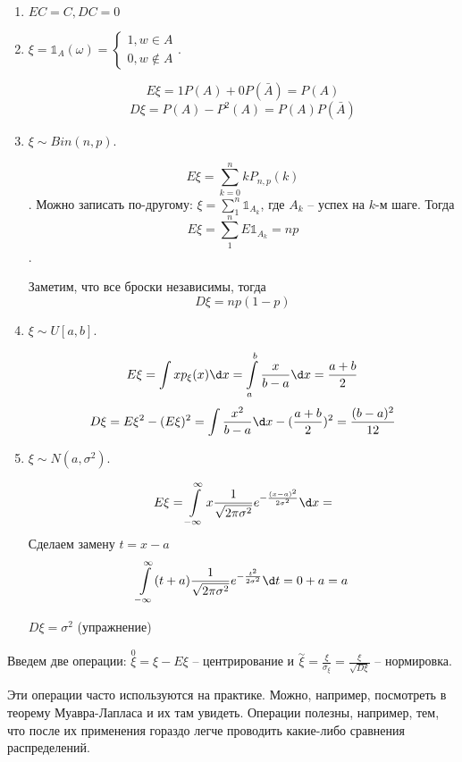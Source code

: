 \begin{exmp}

\begin{enumerate}

\item $EC = C, DC = 0$
\item $\xi = \mathbb{1}_A(\omega) = \begin{cases} 1, w \in A \\ 0, w \notin A \end{cases}$.

$$E\xi = 1 P(A) + 0 P(\bar A) = P(A)$$
$$D\xi = P(A) - P^2(A) = P(A) P(\bar A)$$
\item $\xi \sim Bin(n, p)$. 

$$E\xi = \sum\limits_{k=0}^n k P_{n, p}(k)$$. 
Можно записать по-другому: $\xi = \sum\limits_1^n \mathbb{1}_{A_k}$, где $A_k$ -- успех на $k$-м шаге. Тогда $$E\xi = \sum\limits_1^n E \mathbb{1}_{A_k} = np$$.

Заметим, что все броски независимы, тогда 
$$D\xi = n p (1-p)$$

\item $\xi \sim U[a, b]$. 

$$E \xi = \int x p_\xi(x) \d x = \int\limits_a^b \frac{x}{b - a} \d x = \frac{a + b}{2}$$
$$D \xi = E\xi^2 - (E\xi)^2 = \int\frac{x^2}{b-a}\d x - (\frac{a + b}{2})^2 = \frac{(b - a)^2}{12}$$

\item
$\xi \sim N(a, \sigma^2)$.

$$E\xi = \int\limits_{-\infty}^{\infty} x \frac{1}{\sqrt{2\pi \sigma^2}} e^{-\frac{(x - a)^2}{2\sigma^2}} \d x = $$
Сделаем замену $t = x - a$
$$\int\limits_{-\infty}^\infty (t + a)\frac{1}{\sqrt{2\pi \sigma^2}} e^{-\frac{t^2}{2\sigma^2}} \d t = 0 + a = a$$

$D\xi = \sigma^2$ (упражнение)
\end{enumerate}
\end{exmp}

Введем две операции: $\stackrel{0}{\xi} = \xi - E\xi$  -- центрирование и $\stackrel{\sim}{\xi} = \frac{\xi}{\sigma_\xi} = \frac{\xi}{\sqrt{D\xi}}$ -- нормировка.

Эти операции часто используются на практике. Можно, например, посмотреть в теорему Муавра-Лапласа и их там увидеть.
Операции полезны, например, тем, что после их применения гораздо легче проводить какие-либо сравнения распределений.

